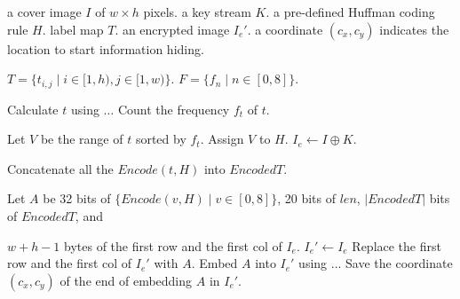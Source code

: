 \begin{algorithm}
	\caption{The content owner generates an encrypted image}
	
	\begin{algorithmic}[1]
		\Require a cover image $I$ of $w \times h$ pixels.
		\Require a key stream $K$.
		\Require a pre-defined Huffman coding rule $H$.
		\Ensure label map $T$.
		\Ensure an encrypted image $I_e\prime$.
		\Ensure a coordinate $(c_x, c_y)$ indicates the location to start information hiding.
		
		\State $T = \{t_{i, j} \mid i \in [1, h), j \in [1, w)\}$. 
		\State $F = \{f_n \mid n \in [0, 8]\}$. 

 
			\State Calculate $t$ using $\dots$
			\State Count the frequency $f_t$ of $t$.
		\EndFor
		
		\State Let $V$ be the range of $t$ sorted by $f_t$.
		\State Assign $V$ to $H$.
		\State $I_e \gets I \oplus K$.
		
		\State Concatenate all the $Encode(t, H)$ into $EncodedT$.


		\State Let $A$ be
		\State\hspace{\algorithmicindent} 32 bits of $\{Encode(v, H) \mid v \in [0, 8] \}$,
		\State\hspace{\algorithmicindent} 20 bits of $len$,
		\State\hspace{\algorithmicindent} $\left \vert EncodedT \right \vert$ bits of $EncodedT$, and
		
		\State\hspace{\algorithmicindent} $w + h - 1$ bytes of the first row and the first col of $I_e$.
		\State $I_e\prime \gets I_e$
		\State Replace the first row and the first col of $I_e\prime$ with $A$.
		\State Embed $A$ into $I_e\prime$ using ...
		\State Save the coordinate $(c_x, c_y)$ of the end of embedding $A$ in $I_e\prime$.
	\end{algorithmic}
\end{algorithm}




